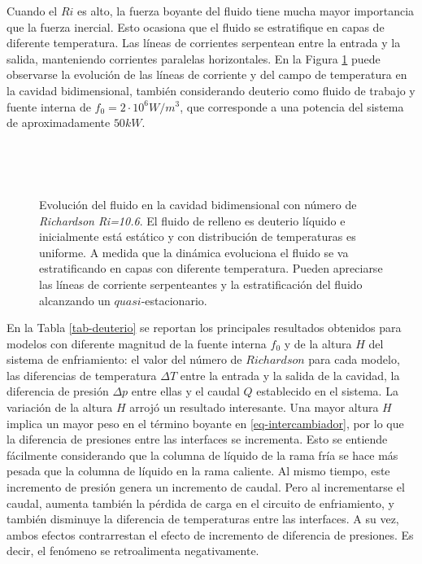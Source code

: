 Cuando el $Ri$ es alto, la fuerza boyante del fluido tiene mucha mayor importancia que la fuerza inercial.
Esto ocasiona que el fluido se estratifique en capas de diferente temperatura.
Las líneas de corrientes serpentean entre la entrada y la salida, manteniendo corrientes paralelas horizontales.
En la Figura \ref{evol-ri10} puede observarse la evolución de las líneas de corriente y del campo de temperatura en la cavidad bidimensional,
también considerando deuterio como fluido de trabajo y fuente interna de $f_0=2\cdot10^6W/m^3$,
que corresponde a una potencia del sistema de aproximadamente $50kW$.

\begin{figure}[ht]
\begin{minipage}{.5\linewidth}
\centering
{}\\
\end{minipage}\hfill
\begin{minipage}{.5\linewidth}
\centering
{}\\
\end{minipage}
\caption[Evolución del fluido en la cavidad bidimensional a bajo Richardson]
{Evolución del fluido en la cavidad bidimensional con número de \textit{Richardson Ri=10.6}.
 El fluido de relleno es deuterio líquido e inicialmente está estático y con distribución de temperaturas es uniforme.
 A medida que la dinámica evoluciona el fluido se va estratificando en capas con diferente temperatura.
 Pueden apreciarse las líneas de corriente serpenteantes y la estratificación del fluido alcanzando un $quasi$-estacionario.}
\label{evol-ri10}
\end{figure}

En la Tabla \ref{tab-deuterio} se reportan los principales resultados obtenidos para modelos con diferente magnitud de la fuente interna $f_0$
y de la altura $H$ del sistema de enfriamiento:
el valor del número de $Richardson$ para cada modelo,
las diferencias de temperatura $\Delta T$ entre la entrada y la salida de la cavidad,
la diferencia de presión $\Delta p$ entre ellas y el caudal $Q$ establecido en el sistema.
La variación de la altura $H$ arrojó un resultado interesante.
Una mayor altura $H$ implica un mayor peso en el término boyante en \ref{eq-intercambiador}, por lo que la diferencia de presiones entre las interfaces se incrementa.
Esto se entiende fácilmente considerando que la columna de líquido de la rama fría se hace más pesada que la columna de líquido en la rama caliente.
Al mismo tiempo, este incremento de presión genera un incremento de caudal.
Pero al incrementarse el caudal, aumenta también la pérdida de carga en el circuito de enfriamiento,
y también disminuye la diferencia de temperaturas entre las interfaces.
A su vez, ambos efectos contrarrestan el efecto de incremento de diferencia de presiones.
Es decir, el fenómeno se retroalimenta negativamente.

